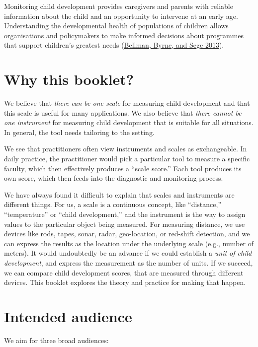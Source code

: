\documentclass[
]{book}
\begin{document}
Monitoring child development provides caregivers and parents with reliable information about the child and an opportunity to intervene at an early age. Understanding the developmental health of populations of children allows organisations and policymakers to make informed decisions about programmes that support children's greatest needs (\protect\hyperlink{ref-bellman2013}{Bellman, Byrne, and Sege 2013}).

\hypertarget{sec:why}{%
\section{Why this booklet?}\label{sec:why}}

We believe that \emph{there can be one scale} for measuring child development and that this scale is useful for many applications. We also believe that \emph{there cannot be one instrument} for measuring child development that is suitable for all situations. In general, the tool needs tailoring to the setting.

We see that practitioners often view instruments and scales as exchangeable. In daily practice, the practitioner would pick a particular tool to measure a specific faculty, which then effectively produces a ``scale score.'' Each tool produces its own score, which then feeds into the diagnostic and monitoring process.

We have always found it difficult to explain that scales and instruments are different things. For us, a scale is a continuous concept, like ``distance,'' ``temperature'' or ``child development,'' and the instrument is the way to assign values to the particular object being measured. For measuring distance, we use devices like rods, tapes, sonar, radar, geo-location, or red-shift detection, and we can express the results as the location under the underlying scale (e.g., number of meters). It would undoubtedly be an advance if we could establish a \emph{unit of child development}, and express the measurement as the number of units. If we succeed, we can compare child development scores, that are measured through different devices. This booklet explores the theory and practice for making that happen.

\hypertarget{sec:audience}{%
\section{Intended audience}\label{sec:audience}}

We aim for three broad audiences:
\end{document}
